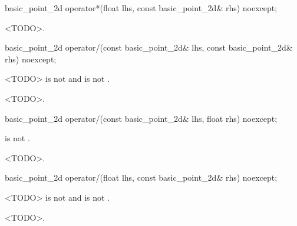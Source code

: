 %
\begin{itemdecl}
basic_point_2d operator*(float lhs, const basic_point_2d& rhs) noexcept;
\end{itemdecl}
\begin{itemdescr}
\pnum
\returns
<TODO>.
\end{itemdescr}

%
\begin{itemdecl}
basic_point_2d operator/(const basic_point_2d& lhs, const basic_point_2d& rhs) noexcept;
\end{itemdecl}
\begin{itemdescr}
\pnum
\requires
<TODO> is not  and  is not .

\pnum
\returns
<TODO>.
\end{itemdescr}

%
\begin{itemdecl}
basic_point_2d operator/(const basic_point_2d& lhs, float rhs) noexcept;
\end{itemdecl}
\begin{itemdescr}
\pnum
\requires
{} is not .

\pnum
\returns
<TODO>.
\end{itemdescr}

%
\begin{itemdecl}
basic_point_2d operator/(float lhs, const basic_point_2d& rhs) noexcept;
\end{itemdecl}
\begin{itemdescr}
\pnum
\requires
<TODO> is not  and  is not .

\pnum
\returns
<TODO>.
\end{itemdescr}

